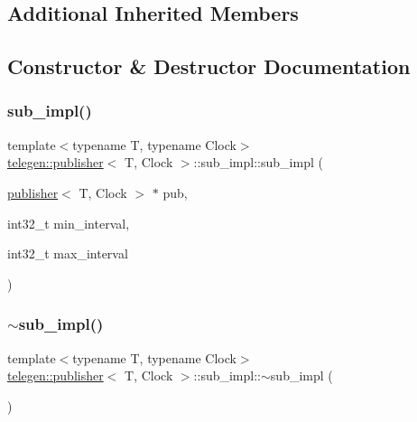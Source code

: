 \subsection*{Additional Inherited Members}


\subsection{Constructor \& Destructor Documentation}
\mbox{\label{classtelegen_1_1publisher_1_1sub__impl_af79e7e1cbc3f4eb803b42438328a1bb1}} 
\subsubsection{\texorpdfstring{sub\+\_\+impl()}{sub\_impl()}}
{\footnotesize\ttfamily template$<$typename T, typename Clock$>$ \\
\hyperlink{classtelegen_1_1publisher}{telegen\+::publisher}$<$ T, Clock $>$\+::sub\+\_\+impl\+::sub\+\_\+impl (\begin{DoxyParamCaption}\item[{\hyperlink{classtelegen_1_1publisher}{publisher}$<$ T, Clock $>$ $\ast$}]{pub,  }\item[{int32\+\_\+t}]{min\+\_\+interval,  }\item[{int32\+\_\+t}]{max\+\_\+interval }\end{DoxyParamCaption})\hspace{0.3cm}{\ttfamily [inline]}}

\mbox{\label{classtelegen_1_1publisher_1_1sub__impl_a91197bedcf945e62ca5ab0a5cd577081}} 
\subsubsection{\texorpdfstring{$\sim$sub\+\_\+impl()}{~sub\_impl()}}
{\footnotesize\ttfamily template$<$typename T, typename Clock$>$ \\
\hyperlink{classtelegen_1_1publisher}{telegen\+::publisher}$<$ T, Clock $>$\+::sub\+\_\+impl\+::$\sim$sub\+\_\+impl (\begin{DoxyParamCaption}{ }\end{DoxyParamCaption})\hspace{0.3cm}{\ttfamily [inline]}}



